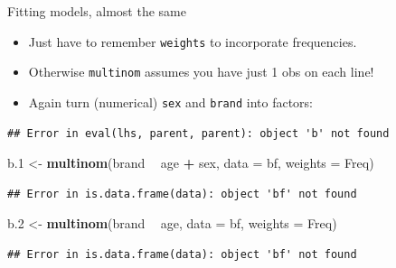 \documentclass[ignorenonframetext,]{beamer}
\newenvironment{Shaded}{\begin{snugshade}}{\end{snugshade}}
\newcommand{\DataTypeTok}[1]{\textcolor[rgb]{0.13,0.29,0.53}{#1}}
\newcommand{\FloatTok}[1]{\textcolor[rgb]{0.00,0.00,0.81}{#1}}
\newcommand{\KeywordTok}[1]{\textcolor[rgb]{0.13,0.29,0.53}{\textbf{#1}}}
\newcommand{\NormalTok}[1]{#1}
\newcommand{\OperatorTok}[1]{\textcolor[rgb]{0.81,0.36,0.00}{\textbf{#1}}}
\newcommand{\StringTok}[1]{\textcolor[rgb]{0.31,0.60,0.02}{#1}}
\begin{document}
\begin{frame}[fragile]{Fitting models, almost the same}
\protect\hypertarget{fitting-models-almost-the-same}{}

\begin{itemize}
\item
  Just have to remember \texttt{weights} to incorporate frequencies.
\item
  Otherwise \texttt{multinom} assumes you have just 1 obs on each line!
\item
  Again turn (numerical) \texttt{sex} and \texttt{brand} into factors:
\end{itemize}

\footnotesize

\begin{Shaded}
\end{Shaded}

\begin{verbatim}
## Error in eval(lhs, parent, parent): object 'b' not found
\end{verbatim}

\begin{Shaded}
\begin{Highlighting}[]
\NormalTok{b}\FloatTok{.1}\NormalTok{ <-}\StringTok{ }\KeywordTok{multinom}\NormalTok{(brand }\OperatorTok{~}\StringTok{ }\NormalTok{age }\OperatorTok{+}\StringTok{ }\NormalTok{sex, }\DataTypeTok{data =}\NormalTok{ bf, }\DataTypeTok{weights =}\NormalTok{ Freq)}
\end{Highlighting}
\end{Shaded}

\begin{verbatim}
## Error in is.data.frame(data): object 'bf' not found
\end{verbatim}

\begin{Shaded}
\begin{Highlighting}[]
\NormalTok{b}\FloatTok{.2}\NormalTok{ <-}\StringTok{ }\KeywordTok{multinom}\NormalTok{(brand }\OperatorTok{~}\StringTok{ }\NormalTok{age, }\DataTypeTok{data =}\NormalTok{ bf, }\DataTypeTok{weights =}\NormalTok{ Freq)}
\end{Highlighting}
\end{Shaded}

\begin{verbatim}
## Error in is.data.frame(data): object 'bf' not found
\end{verbatim}

\normalsize

\end{frame}
\end{document}
